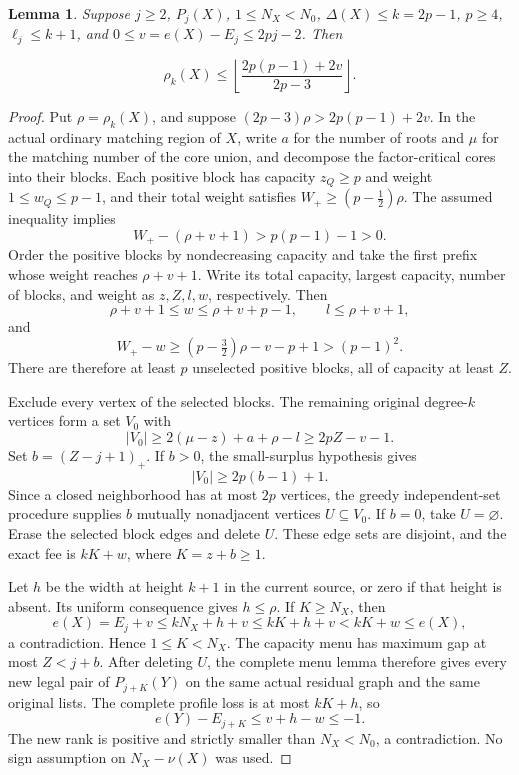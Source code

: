 \documentclass[11pt,a4paper]{article}
\newtheorem{lemma}[theorem]{Lemma}
\theoremstyle{definition}
\begin{document}
\begin{lemma}\label{lem:strong-odd-price}
Suppose \(j\ge2\), \(P_j(X)\), \(1\le N_X<N_0\),
\(\Delta(X)\le k=2p-1\), \(p\ge4\), \(\ell_j\le k+1\), and
\(0\le v=e(X)-E_j\le2pj-2\). Then

\[
\rho_k(X)\le
\left\lfloor\frac{2p(p-1)+2v}{2p-3}\right\rfloor.
\]
\end{lemma}\begin{proof}
Put \(\rho=\rho_k(X)\), and suppose
\((2p-3)\rho>2p(p-1)+2v\).
In the actual ordinary matching region of \(X\), write \(a\) for the number of roots and \(\mu\) for the matching number of the core union, and decompose the factor-critical cores into their blocks. Each positive block has capacity \(z_Q\ge p\) and weight
\(1\le w_Q\le p-1\), and their total weight satisfies
\(W_+\ge(p-\tfrac12)\rho\).
The assumed inequality implies
\[
W_+-(\rho+v+1)>
p(p-1)-1>0.
\]
Order the positive blocks by nondecreasing capacity and take the first prefix whose weight reaches \(\rho+v+1\). Write its total capacity, largest capacity, number of blocks, and weight as \(z,Z,l,w\), respectively. Then
\[
\rho+v+1\le w\le\rho+v+p-1,\qquad l\le\rho+v+1,
\]
and
\[
W_+-w\ge(p-\tfrac32)\rho-v-p+1>(p-1)^2.
\]
There are therefore at least \(p\) unselected positive blocks, all of capacity at least \(Z\).

Exclude every vertex of the selected blocks. The remaining original degree-\(k\) vertices form a set \(V_0\) with
\[
|V_0|\ge2(\mu-z)+a+\rho-l\ge2pZ-v-1.
\]
Set \(b=(Z-j+1)_+\). If \(b>0\), the small-surplus hypothesis gives
\[
|V_0|\ge2p(b-1)+1.
\]
Since a closed neighborhood has at most \(2p\) vertices, the greedy independent-set procedure supplies \(b\) mutually nonadjacent vertices \(U\subseteq V_0\). If \(b=0\), take \(U=\varnothing\).
Erase the selected block edges and delete \(U\). These edge sets are disjoint, and the exact fee is \(kK+w\), where \(K=z+b\ge1\).

Let \(h\) be the width at height \(k+1\) in the current source, or zero if that height is absent. Its uniform consequence gives \(h\le\rho\). If \(K\ge N_X\), then
\[
e(X)=E_j+v\le kN_X+h+v
\le kK+h+v<kK+w\le e(X),
\]
a contradiction. Hence \(1\le K<N_X\).
The capacity menu has maximum gap at most \(Z<j+b\). After deleting \(U\), the complete menu lemma therefore gives every new legal pair of \(P_{j+K}(Y)\) on the same actual residual graph and the same original lists. The complete profile loss is at most \(kK+h\), so
\[
e(Y)-E_{j+K}\le v+h-w\le-1.
\]
The new rank is positive and strictly smaller than \(N_X<N_0\), a contradiction. No sign assumption on \(N_X-\nu(X)\) was used.
\end{proof}
\end{document}
